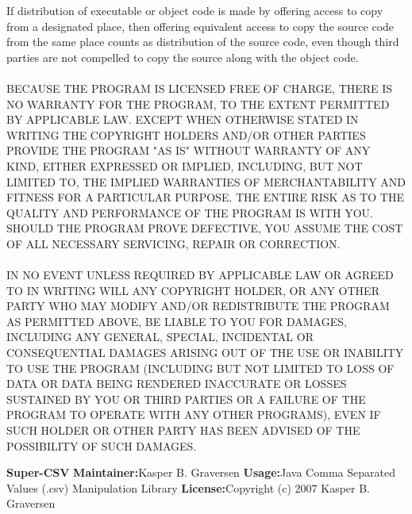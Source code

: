 \newline
\begin{addmargin}[4.5em]{0em}
    \fontsize{10pt}{12pt}\selectfont
    If distribution of executable or object code is made by offering access to copy from a designated place,
    then offering equivalent access to copy the source code from the same place counts as distribution of
    the source code, even though third parties are not compelled to copy the source along with the object code.
    \\ \\
    \uppercase{BECAUSE THE PROGRAM IS LICENSED FREE OF CHARGE, THERE IS NO WARRANTY FOR THE PROGRAM,
    TO THE EXTENT PERMITTED BY APPLICABLE LAW. EXCEPT WHEN OTHERWISE STATED IN WRITING THE COPYRIGHT
    HOLDERS AND/OR OTHER PARTIES PROVIDE THE PROGRAM "AS IS" WITHOUT WARRANTY OF ANY KIND, EITHER
    EXPRESSED OR IMPLIED, INCLUDING, BUT NOT LIMITED TO, THE IMPLIED WARRANTIES OF MERCHANTABILITY
    AND FITNESS FOR A PARTICULAR PURPOSE. THE ENTIRE RISK AS TO THE QUALITY AND PERFORMANCE OF THE
    PROGRAM IS WITH YOU. SHOULD THE PROGRAM PROVE DEFECTIVE, YOU ASSUME THE COST OF ALL NECESSARY
    SERVICING, REPAIR OR CORRECTION.
    \\ \\
    IN NO EVENT UNLESS REQUIRED BY APPLICABLE LAW OR AGREED TO IN WRITING WILL ANY COPYRIGHT HOLDER,
    OR ANY OTHER PARTY WHO MAY MODIFY AND/OR REDISTRIBUTE THE PROGRAM AS PERMITTED ABOVE, BE LIABLE
    TO YOU FOR DAMAGES, INCLUDING ANY GENERAL, SPECIAL, INCIDENTAL OR CONSEQUENTIAL DAMAGES ARISING
    OUT OF THE USE OR INABILITY TO USE THE PROGRAM (INCLUDING BUT NOT LIMITED TO LOSS OF DATA OR DATA
    BEING RENDERED INACCURATE OR LOSSES SUSTAINED BY YOU OR THIRD PARTIES OR A FAILURE OF THE PROGRAM
    TO OPERATE WITH ANY OTHER PROGRAMS), EVEN IF SUCH HOLDER OR OTHER PARTY HAS BEEN ADVISED OF THE
    POSSIBILITY OF SUCH DAMAGES.}
\end{addmargin}
\newpage
{\bfseries Super-CSV}
\newline
\newline
{\bfseries Maintainer:}{\space Kasper B. Graversen}
\newline
\newline
{\bfseries Usage:}{\space Java Comma Separated Values (.csv) Manipulation Library}
\newline
\newline
{\bfseries License:}{\space Copyright (c) 2007 Kasper B. Graversen}
\newline
